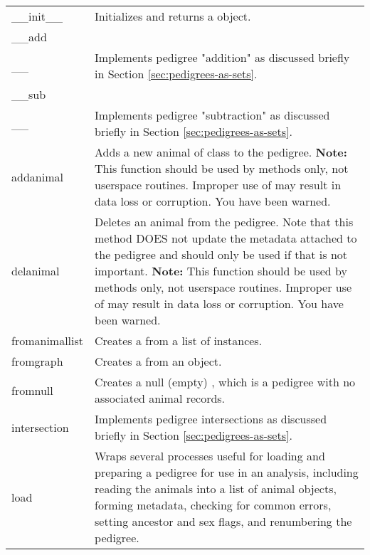 \begin{center}
    \tablelasttail{\hline}
    \label{tbl:objects-newpedigree-methods}
    \begin{xtabular}{l|p{4in}}
		\_\_init\_\_ & Initializes and returns a  object. \\
		\_\_add\\_\_ & Implements pedigree "addition" as discussed briefly in Section \ref{sec:pedigrees-as-sets}. \\
		\_\_sub\\_\_ & Implements pedigree "subtraction" as discussed briefly in Section \ref{sec:pedigrees-as-sets}. \\
		addanimal & Adds a new animal of class  to the pedigree. \textbf{Note:} This function should be used by  methods only, not userspace routines. Improper use of  may result in data loss or corruption. You have been warned. \\
		delanimal & Deletes an animal from the pedigree. Note that this method DOES not update the metadata attached to the pedigree and should only be used if that is not important. \textbf{Note:} This function should be used by  methods only, not userspace routines. Improper use of  may result in data loss or corruption. You have been warned. \\
		fromanimallist & Creates a  from a list of  instances. \\
		fromgraph & Creates a  from an  object. \\
		fromnull & Creates a null (empty) , which is a pedigree with no associated animal records. \\
		intersection & Implements pedigree intersections as discussed briefly in Section \ref{sec:pedigrees-as-sets}. \\
		load & Wraps several processes useful for loading and preparing a pedigree for use in an analysis, including reading the animals into a list of animal objects, forming metadata, checking for common errors, setting ancestor and sex flags, and renumbering the pedigree. \\

\end{xtabular}
\end{center}
